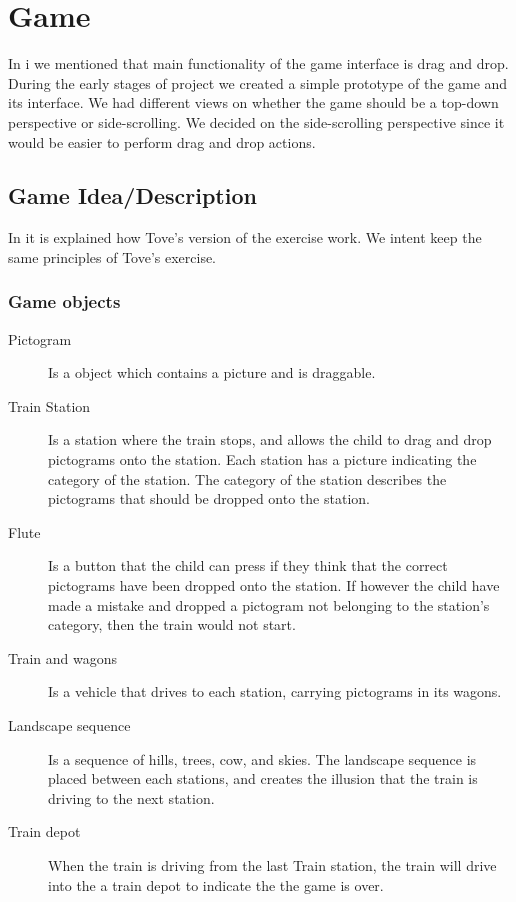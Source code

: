 \section{Game}
In  i we mentioned that main functionality of the game interface is drag and drop. During the early stages of project we created a simple prototype of the game and its interface. We had different views on whether the game should be a top-down perspective or side-scrolling. We decided on the side-scrolling perspective since it would be easier to perform drag and drop actions.
\subsection{Game Idea/Description}
In  it is explained how Tove's version of the exercise work. We intent keep the same principles of Tove's exercise.
\subsubsection*{Game objects}
\begin{description}
\item[Pictogram] Is a object which contains a picture and is draggable.
\item[Train Station] Is a station where the train stops, and allows the child to drag and drop pictograms onto the station. Each station has a picture indicating the category of the station. The category of the station describes the pictograms that should be dropped onto the station.  

\item[Flute] Is a button that the child can press if they think that the correct pictograms have been dropped onto the station. If however the child have made a mistake and dropped a pictogram not belonging to the station's category, then the train would not start.

\item[Train and wagons] Is a vehicle that drives to each station, carrying pictograms in its wagons.

\item[Landscape sequence] Is a sequence of hills, trees, cow, and skies. The landscape sequence is placed between each stations, and creates the illusion that the train is driving to the next station.
\item[Train depot] When the train is driving from the last Train station, the train will drive into the a train depot to indicate the the game is over.
\end{description}

